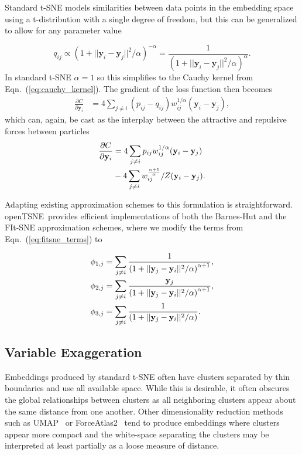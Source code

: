 \documentclass[twocolumn]{bmcart}
\newcommand{\opentsne}{\textsf{openTSNE}}
\begin{document}
Standard t-SNE models similarities between data points in the embedding space
using a t-distribution with a single degree of freedom, but this can be
generalized to allow for any parameter value

\begin{equation}
q_{ij} \propto \left ( 1 + || \mathbf{y}_i - \mathbf{y}_j ||^2 / \alpha \right )^{-\alpha} = \frac{1}{\left( 1 + || \mathbf{y}_i - \mathbf{y}_j ||^2 / \alpha \right)^\alpha }.
\end{equation}
In standard t-SNE $\alpha=1$ so this simplifies to the Cauchy kernel from
Eqn.~(\ref{eq:cauchy_kernel}). The gradient of the loss function then becomes
\begin{align}
\frac{\partial C}{\partial \mathbf{y}_i} &= 4 \sum_{j \neq i} \left ( p_{ij} - q_{ij} \right ) w_{ij}^{1/\alpha} \left ( \mathbf{y}_i - \mathbf{y}_j \right ),
\end{align}
which can, again, be cast as the interplay between the attractive and repulsive forces between particles
\begin{align}
\frac{\partial C}{\partial \mathbf{y}_i} &= 4 \sum_{j \neq i} p_{ij} w_{ij}^{1/\alpha} (\mathbf{y}_i - \mathbf{y}_j) \notag \\
&- 4 \sum_{j \neq i} w_{ij}^{\frac{\alpha+1}{\alpha}} / Z (\mathbf{y}_i - \mathbf{y}_j).
\end{align}

Adapting existing approximation schemes to this formulation is straightforward.
\opentsne\ provides efficient implementations of both the Barnes-Hut and the
FIt-SNE approximation schemes, where we modify the terms from
Eqn.~(\ref{eq:fitsne_terms}) to

\begin{align}
\phi_{1,j} &= \sum_{j \neq i} \frac{1}{\left( 1 + || \mathbf{y}_j - \mathbf{y}_i ||^2 / \alpha \right)^{\alpha+1}}, \notag \\
\phi_{2,j} &= \sum_{j \neq i} \frac{\mathbf{y}_j}{\left( 1 + || \mathbf{y}_j - \mathbf{y}_i ||^2 / \alpha \right)^{\alpha+1}}, \notag \\
\phi_{3,j} &= \sum_{j \neq i} \frac{1}{\left( 1 + || \mathbf{y}_j - \mathbf{y}_i ||^2 / \alpha \right)}. \notag
\end{align}

\subsection*{Variable Exaggeration}

Embeddings produced by standard t-SNE often have clusters separated by
thin boundaries and use all available space. While this is desirable,
it often obscures the global relationships between clusters as all
neighboring clusters appear about the same distance from one
another. Other dimensionality reduction methods such as
UMAP~\cite{2018arXivUMAP} or ForceAtlas2~\cite{jacomy2014forceatlas2}
tend to produce embeddings where clusters appear more compact and the
white-space separating the clusters may be interpreted at least
partially as a loose measure of distance.
\end{document}

